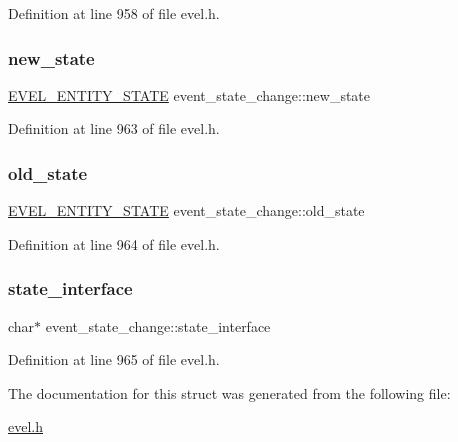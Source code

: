Definition at line 958 of file evel.\+h.

\hypertarget{structevent__state__change_a80a79f30c9d09fcfb1008a69eb8c0cd8}{}\label{structevent__state__change_a80a79f30c9d09fcfb1008a69eb8c0cd8} 
\subsubsection{\texorpdfstring{new\+\_\+state}{new\_state}}
{\footnotesize\ttfamily \hyperlink{evel_8h_a98a07355771fa850672520cd1e9b1168}{E\+V\+E\+L\+\_\+\+E\+N\+T\+I\+T\+Y\+\_\+\+S\+T\+A\+TE} event\+\_\+state\+\_\+change\+::new\+\_\+state}



Definition at line 963 of file evel.\+h.

\hypertarget{structevent__state__change_a61cc2c3d53fed278ded76e075676c123}{}\label{structevent__state__change_a61cc2c3d53fed278ded76e075676c123} 
\subsubsection{\texorpdfstring{old\+\_\+state}{old\_state}}
{\footnotesize\ttfamily \hyperlink{evel_8h_a98a07355771fa850672520cd1e9b1168}{E\+V\+E\+L\+\_\+\+E\+N\+T\+I\+T\+Y\+\_\+\+S\+T\+A\+TE} event\+\_\+state\+\_\+change\+::old\+\_\+state}



Definition at line 964 of file evel.\+h.

\hypertarget{structevent__state__change_a4ec776b568e63eb24d10105c39b5c70f}{}\label{structevent__state__change_a4ec776b568e63eb24d10105c39b5c70f} 
\subsubsection{\texorpdfstring{state\+\_\+interface}{state\_interface}}
{\footnotesize\ttfamily char$\ast$ event\+\_\+state\+\_\+change\+::state\+\_\+interface}



Definition at line 965 of file evel.\+h.



The documentation for this struct was generated from the following file\+:\begin{DoxyCompactItemize}
\item 
\hyperlink{evel_8h}{evel.\+h}\end{DoxyCompactItemize}
